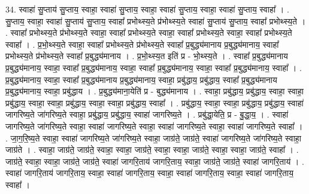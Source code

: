 \documentclass[17pt]{extarticle}
\begin{document}
34. स्वाहा॑ सु॒प्ताय॑ सु॒प्ताय॒ स्वाहा॒ स्वाहा॑ सु॒प्ताय॒ स्वाहा॒ स्वाहा॑ सु॒प्ताय॒ स्वाहा॒ स्वाहा॑ सु॒प्ताय॒ स्वाहा᳚ । . सु॒प्ताय॒ स्वाहा॒ स्वाहा॑ सु॒प्ताय॑ सु॒प्ताय॒ स्वाहा᳚ प्रभोथ्स्य॒ते प्र॑भोथ्स्य॒ते स्वाहा॑ सु॒प्ताय॑ सु॒प्ताय॒ स्वाहा᳚ प्रभोथ्स्य॒ते । . स्वाहा᳚ प्रभोथ्स्य॒ते प्र॑भोथ्स्य॒ते स्वाहा॒ स्वाहा᳚ प्रभोथ्स्य॒ते स्वाहा॒ स्वाहा᳚ प्रभोथ्स्य॒ते स्वाहा॒ स्वाहा᳚ प्रभोथ्स्य॒ते स्वाहा᳚ । . प्र॒भो॒थ्स्य॒ते स्वाहा॒ स्वाहा᳚ प्रभोथ्स्य॒ते प्र॑भोथ्स्य॒ते स्वाहा᳚ प्र॒बुद्ध्य॑मानाय प्र॒बुद्ध्य॑मानाय॒ स्वाहा᳚ प्रभोथ्स्य॒ते प्र॑भोथ्स्य॒ते स्वाहा᳚ प्र॒बुद्ध्य॑मानाय । . प्र॒भो॒थ्स्य॒त इति॑ प्र - भो॒थ्स्य॒ते । . स्वाहा᳚ प्र॒बुद्ध्य॑मानाय प्र॒बुद्ध्य॑मानाय॒ स्वाहा॒ स्वाहा᳚ प्र॒बुद्ध्य॑मानाय॒ स्वाहा॒ स्वाहा᳚ प्र॒बुद्ध्य॑मानाय॒ स्वाहा॒ स्वाहा᳚ प्र॒बुद्ध्य॑मानाय॒ स्वाहा᳚ । . प्र॒बुद्ध्य॑मानाय॒ स्वाहा॒ स्वाहा᳚ प्र॒बुद्ध्य॑मानाय प्र॒बुद्ध्य॑मानाय॒ स्वाहा॒ प्रबु॑द्धाय॒ प्रबु॑द्धाय॒ स्वाहा᳚ प्र॒बुद्ध्य॑मानाय प्र॒बुद्ध्य॑मानाय॒ स्वाहा॒ प्रबु॑द्धाय । . प्र॒बुद्ध्य॑माना॒येति॑ प्र - बुद्ध्य॑मानाय । . स्वाहा॒ प्रबु॑द्धाय॒ प्रबु॑द्धाय॒ स्वाहा॒ स्वाहा॒ प्रबु॑द्धाय॒ स्वाहा॒ स्वाहा॒ प्रबु॑द्धाय॒ स्वाहा॒ स्वाहा॒ प्रबु॑द्धाय॒ स्वाहा᳚ । . प्रबु॑द्धाय॒ स्वाहा॒ स्वाहा॒ प्रबु॑द्धाय॒ प्रबु॑द्धाय॒ स्वाहा॑ जागरिष्य॒ते जा॑गरिष्य॒ते स्वाहा॒ प्रबु॑द्धाय॒ प्रबु॑द्धाय॒ स्वाहा॑ जागरिष्य॒ते । . प्रबु॑द्धा॒येति॒ प्र - बु॒द्धा॒य॒ । . स्वाहा॑ जागरिष्य॒ते जा॑गरिष्य॒ते स्वाहा॒ स्वाहा॑ जागरिष्य॒ते स्वाहा॒ स्वाहा॑ जागरिष्य॒ते स्वाहा॒ स्वाहा॑ जागरिष्य॒ते स्वाहा᳚ । . जा॒ग॒रि॒ष्य॒ते स्वाहा॒ स्वाहा॑ जागरिष्य॒ते जा॑गरिष्य॒ते स्वाहा॒ जाग्र॑ते॒ जाग्र॑ते॒ स्वाहा॑ जागरिष्य॒ते जा॑गरिष्य॒ते स्वाहा॒ जाग्र॑ते । . स्वाहा॒ जाग्र॑ते॒ जाग्र॑ते॒ स्वाहा॒ स्वाहा॒ जाग्र॑ते॒ स्वाहा॒ स्वाहा॒ जाग्र॑ते॒ स्वाहा॒ स्वाहा॒ जाग्र॑ते॒ स्वाहा᳚ । . जाग्र॑ते॒ स्वाहा॒ स्वाहा॒ जाग्र॑ते॒ जाग्र॑ते॒ स्वाहा॑ जागरि॒ताय॑ जागरि॒ताय॒ स्वाहा॒ जाग्र॑ते॒ जाग्र॑ते॒ स्वाहा॑ जागरि॒ताय॑ । . स्वाहा॑ जागरि॒ताय॑ जागरि॒ताय॒ स्वाहा॒ स्वाहा॑ जागरि॒ताय॒ स्वाहा॒ स्वाहा॑ जागरि॒ताय॒ स्वाहा॒ स्वाहा॑ जागरि॒ताय॒ स्वाहा᳚ । \newline
\end{document}
